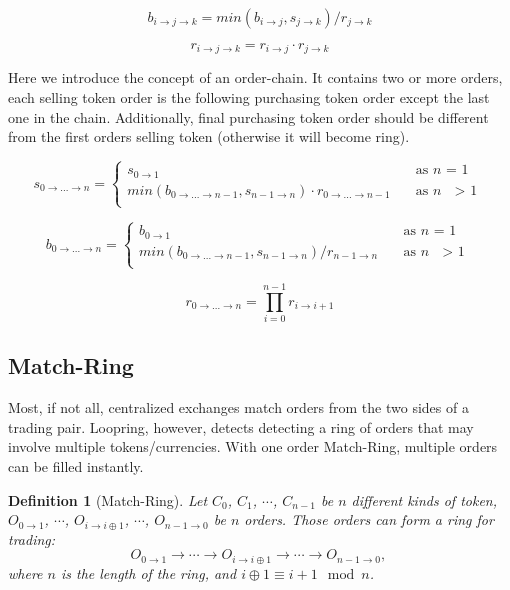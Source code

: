 \documentclass[UTF8,nofonts]{article}
\newtheorem{definition}{Definition}[section]
\begin{document}
\begin{equation}
b_{i\rightarrow j\rightarrow k}=min(b_{i\rightarrow j}, s_{j\rightarrow k}) / r_{j\rightarrow k}
\end{equation}

\begin{equation}
r_{i\rightarrow j\rightarrow k}= r_{i\rightarrow j}\cdot r_{j\rightarrow k}
\end{equation}


Here we introduce the concept of an order-chain. It contains two or more orders, each selling token order is the following  purchasing token order except the last one in the chain. Additionally, final purchasing token order should be different from the first orders selling token (otherwise it will become ring).

\[ s_{0\rightarrow ...\rightarrow n} =
 \begin{cases}
  s_{0\rightarrow 1}   & \quad \text{as } n \text{ = 1}\\
  min(b_{0\rightarrow ...\rightarrow n-1}, s_{n-1\rightarrow n}) \cdot r_{0\rightarrow ...\rightarrow n-1} & \quad \text{as\ } n \text{ $>$ 1}\\
 \end{cases}
\]

\[ b_{0\rightarrow ...\rightarrow n} =
 \begin{cases}
  b_{0\rightarrow 1}   & \quad \text{as } n \text{ = 1}\\
  min(b_{0\rightarrow ...\rightarrow n-1}, s_{n-1\rightarrow n}) / r_{n-1\rightarrow n} & \quad \text{as\ } n \text{ $>$ 1}\\
 \end{cases}
\]


\[ r_{0\rightarrow ...\rightarrow n} = \prod_{i=0}^{n-1}{r_{i\rightarrow i+1}}
\]


\subsection{Match-Ring}

Most, if not all, centralized exchanges match orders from the two sides of a trading pair. Loopring, however, detects detecting a ring of orders that may involve multiple tokens/currencies. With one order Match-Ring, multiple orders can be filled instantly.

\begin{definition}[Match-Ring] Let $C_{0}$, $C_{1}$, $\cdots$, $C_{n-1}$ be $n$ different kinds of token, $O_{0\rightarrow 1}$, $\cdots$, $O_{i\rightarrow i\oplus 1}$, $\cdots$, $O_{n-1 \rightarrow 0}$ be $n$ orders. Those orders can form a ring for trading:
$$O_{0\rightarrow 1} \rightarrow \cdots \rightarrow O_{i\rightarrow i\oplus 1} \rightarrow \cdots \rightarrow O_{n-1\rightarrow 0} \text{, }$$
where $n$ is the length of the ring, and $i\oplus 1 \equiv i+1 \mod n$.
\end{definition}
\end{document}
